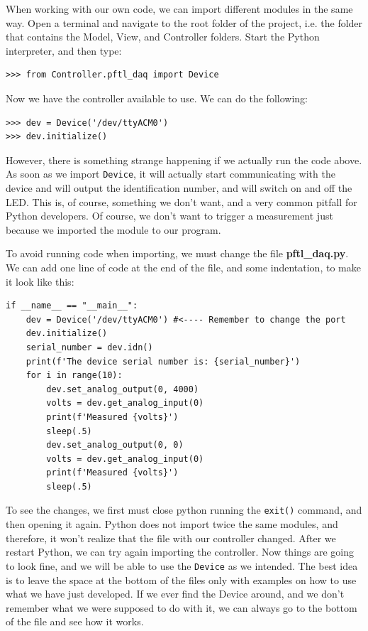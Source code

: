 When working with our own code, we can import different modules in the same way. Open a terminal and navigate to the root folder of the project, i.e. the folder that contains the Model, View, and Controller folders. Start the Python interpreter, and then type:

\begin{verbatim}
>>> from Controller.pftl_daq import Device
\end{verbatim}

Now we have the controller available to use. We can do the following:

\begin{verbatim}
>>> dev = Device('/dev/ttyACM0')
>>> dev.initialize()
\end{verbatim}

However, there is something strange happening if we actually run the code above. As soon as we import \texttt{Device}, it will actually start communicating with the device and will output the identification number, and will switch on and off the LED. This is, of course, something we don't want, and a very common pitfall for Python developers. Of course, we don't want to trigger a measurement just because we imported the module to our program. 

To avoid running code when importing, we must change the file \textbf{pftl\_daq.py}. We can add one line of code at the end of the file, and some indentation, to make it look like this:

\begin{verbatim}
if __name__ == "__main__":
    dev = Device('/dev/ttyACM0') #<---- Remember to change the port
    dev.initialize()
    serial_number = dev.idn()
    print(f'The device serial number is: {serial_number}')
    for i in range(10):
        dev.set_analog_output(0, 4000)
        volts = dev.get_analog_input(0)
        print(f'Measured {volts}')
        sleep(.5)
        dev.set_analog_output(0, 0)
        volts = dev.get_analog_input(0)
        print(f'Measured {volts}')
        sleep(.5)
\end{verbatim}

To see the changes, we first must close python running the \texttt{exit()} command, and then opening it again. Python does not import twice the same modules, and therefore, it won't realize that the file with our controller changed. After we restart Python, we can try again importing the controller. Now things are going to look fine, and we will be able to use the \texttt{Device} as we intended. The best idea is to leave the space at the bottom of the files only with examples on how to use what we have just developed. If we ever find the Device around, and we don't remember what we were supposed to do with it, we can always go to the bottom of the file and see how it works. 

